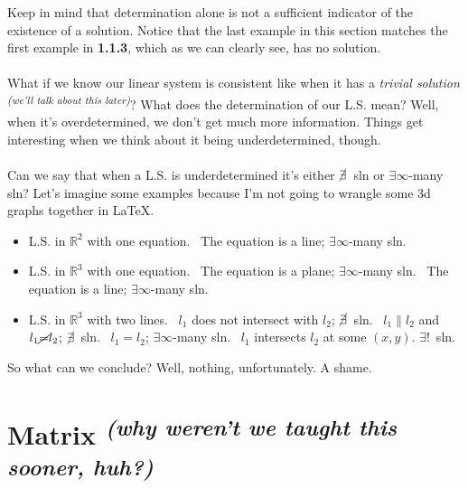 \documentclass{article}
\def\chk{\ding{51}}
\def\xhk{\ding{55}}
\begin{document}
Keep in mind that determination alone is not a sufficient indicator of the
existence of a solution.
Notice that the last example in this section matches the first example in
\textbf{1.1.3}, which as we can clearly see, has no solution.
\\
\\
What if we know our linear system is consistent like when it has a
\textit{trivial solution \textsuperscript{(we'll talk about this later)}}?
What does the determination of our L.S. mean?
Well, when it's overdetermined, we don't get much more information.
Things get interesting when we think about it being underdetermined, though.
\\
\\
Can we say that when a L.S. is underdetermined it's either $\cancel{\exists}$\ sln or
$\exists\infty$-many sln? Let's imagine some examples because I'm not going to
wrangle some 3d graphs together in LaTeX.

\begin{itemize}
   \item L.S. in $\mathbb{R}^2$ with one equation.
      \subitem \chk\ The equation is a line; $\exists\infty$-many sln.
   \item L.S. in $\mathbb{R}^3$ with one equation.
      \subitem \chk\ The equation is a plane; $\exists\infty$-many sln.
      \subitem \chk\ The equation is a line; $\exists\infty$-many sln.
   \item L.S. in $\mathbb{R}^3$ with two lines.
      \subitem \chk\ $l_1$ does not intersect with $l_2$; $\cancel{\exists}$\
         sln.
      \subitem \chk\ $l_1 \parallel l_2$ and $l_1 \cancel{=} l_2$;
         $\cancel{\exists}$\ sln.
      \subitem \chk\ $l_1=l_2$; $\exists\infty$-many sln.
      \subitem \xhk\ $l_1$ intersects $l_2$ at some $(x, y)$. $\exists!$\ sln.
\end{itemize}
So what can we conclude? Well, nothing, unfortunately. A shame.

\section{Matrix \textit{\textsuperscript{(why weren't we taught this sooner, huh?)}}}
\end{document}
